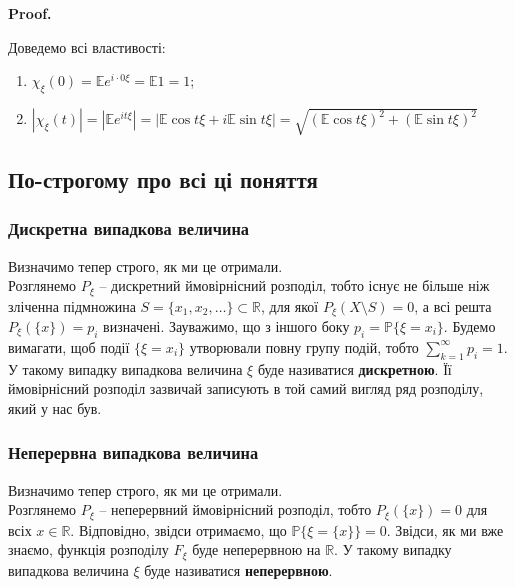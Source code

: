 \documentclass[a4paper, 10pt]{article}
\makeatletter
\theoremstyle{theoremdd}
\renewenvironment{proof}[1][Proof.\\]{\par
\pushQED{\hfill \qed}%
\normalfont \topsep6\p@\@plus6\p@\relax
\trivlist
\item\relax
{\bfseries
#1\@addpunct{.}}\hspace\labelsep\ignorespaces
}{%
\popQED\endtrivlist\@endpefalse
}
\makeatother
\begin{document}
\begin{proof}
Доведемо всі властивості:
\begin{enumerate}[wide=0pt,label={\arabic*)}]
\item $\chi_\xi(0) = \mathbb{E} e^{i \cdot 0\xi} = \mathbb{E}1 = 1$;
\item $|\chi_\xi(t)| = |\mathbb{E} e^{it \xi}| = |\mathbb{E} \cos t \xi + i \mathbb{E} \sin t \xi| = \sqrt{(\mathbb{E} \cos t \xi)^2 + (\mathbb{E} \sin t \xi)^2}$
\end{enumerate}
\end{proof}

\newpage
\subsection*{По-строгому про всі ці поняття}
\subsubsection*{Дискретна випадкова величина}
Визначимо тепер строго, як ми це отримали.\\
Розглянемо $P_\xi$ -- дискретний ймовірнісний розподіл, тобто існує не більше ніж зліченна підмножина $S = \{x_1,x_2,\dots\} \subset \mathbb{R}$, для якої $P_{\xi}(X \setminus S) = 0$, а всі решта $P_\xi(\{x\}) = p_i$ визначені. Зауважимо, що з іншого боку $p_i = \mathbb{P}\{\xi = x_i\}$. Будемо вимагати, щоб події $\{\xi = x_i\}$ утворювали повну групу подій, тобто $\displaystyle\sum_{k=1}^\infty p_i = 1$. У такому випадку випадкова величина $\xi$ буде називатися \textbf{дискретною}. Її ймовірнісний розподіл зазвичай записують в той самий вигляд ряд розподілу, який у нас був.

\subsubsection*{Неперервна випадкова величина}
Визначимо тепер строго, як ми це отримали.\\
Розглянемо $P_{\xi}$ -- неперервний ймовірнісний розподіл, тобто $P_\xi(\{x\}) = 0$ для всіх $x \in \mathbb{R}$. Відповідно, звідси отримаємо, що $\mathbb{P}\{\xi = \{x\}\} = 0$. Звідси, як ми вже знаємо, функція розподілу $F_\xi$ буде неперервною на $\mathbb{R}$. У такому випадку випадкова величина $\xi$ буде називатися \textbf{неперервною}.
\end{document}
